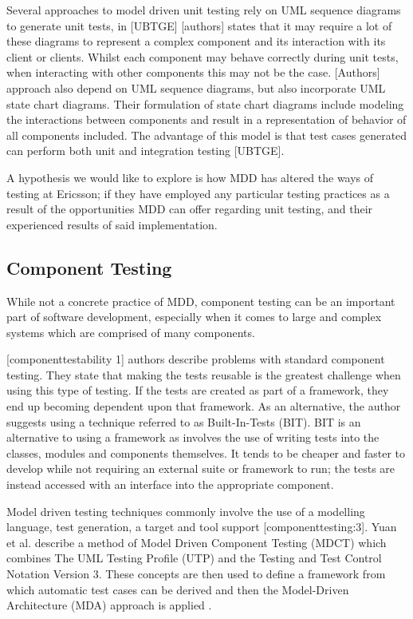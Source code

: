 \documentclass[fina_report_innit.tex]{subfiles}
\begin{document}
Several approaches to model driven unit testing rely on UML sequence diagrams to generate unit tests, in [UBTGE] [authors] states that it may require a lot of these diagrams to represent a complex component and its interaction with its client or clients. Whilst each component may behave correctly during unit tests, when interacting with other components this may not be the case. [Authors] approach also depend on UML sequence diagrams, but also incorporate UML state chart diagrams. Their formulation of state chart diagrams include modeling the interactions between components and result in a representation of behavior of all components included. The advantage of this model is that test cases generated can perform both unit and integration testing [UBTGE].

A hypothesis we would like to explore is how MDD has altered the ways of testing at Ericsson; if they have employed any particular testing practices as a result of the opportunities MDD can offer regarding unit testing, and their experienced results of said implementation. 

\subsection{Component Testing}
While not a concrete practice of MDD, component testing can be an important part of software development, especially when it comes to large and complex systems which are comprised of many components.

[componenttestability 1] authors describe problems with standard component testing. They state that making the tests reusable is the greatest challenge when using this type of testing. If the tests are created as part of a framework, they end up becoming dependent upon that framework. As an alternative, the author suggests using a technique referred to as Built-In-Tests (BIT). BIT is an alternative to using a framework as involves the use of writing tests into the classes, modules and components themselves. It tends to be cheaper and faster to develop while not requiring an external suite or framework to run; the tests are instead accessed with an interface into the appropriate component.

Model driven testing techniques commonly involve the use of a modelling language, test generation, a target and tool support [componenttesting:3]. Yuan et al. \cite{yuan2008model} describe a method of Model Driven Component Testing (MDCT) which combines The UML Testing Profile (UTP)  and the Testing and Test Control Notation Version 3. These concepts are then used to define a framework from which automatic test cases can be derived and then the Model-Driven Architecture (MDA) approach is applied \cite{mellor2004mda}. 
\end{document}
